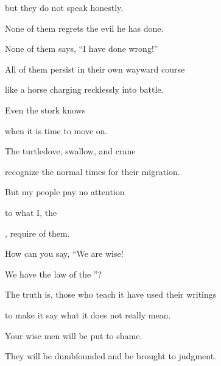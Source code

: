 {\par }{\Q but they do not
speak
honestly.
\par }{\Q None
of them regrets
the evil
he has done.
\par }{\Q None of them says,
“I have
done
wrong!”

\par }{\Q All
of them persist
in their own wayward course
\par }{\Q like a horse
charging recklessly into battle.
\par }{\Q {}Even
the stork
knows
\par }{\Q when it is time to move on.
\par }{\Q The turtledove,
swallow,
and crane
\par }{\Q recognize
the normal times
for their migration.
\par }{\Q But my people
pay
no
attention
\par }{\Q to what I, the

{}, require of them.
\par }{\Q {}How
can you say,
“We are wise!
\par }{\Q We
have the law
of the {}”?
\par }{\Q The truth is, those who teach
it have used their writings
\par }{\Q to make
it say what it does not really mean.
\par }{\Q {}Your wise
men will be put to shame.
\par }{\Q They will be dumbfounded
and be brought to judgment.

}
